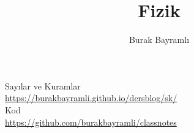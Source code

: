 \documentclass[12pt,a4paper]{report}
\title{Fizik}
\author{Burak Bayramlı}
\date{}
\begin{document}
\maketitle

\newpage

\vspace*{4cm}
\begin{center}
\vspace{0.5cm}
Sayılar ve Kuramlar\\
\vspace{0.5cm}
\url{https://burakbayramli.github.io/dersblog/sk/}\\
\vspace{0.5cm}
Kod\\
\vspace{0.5cm}
\url{https://github.com/burakbayramli/classnotes}\\
\end{center}
\end{document}
